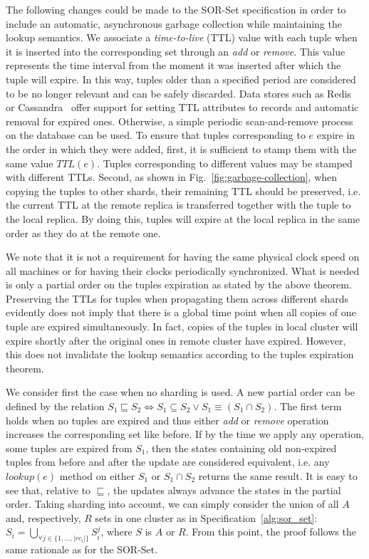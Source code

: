 The following changes could be made to the SOR-Set specification in order to
include an automatic, asynchronous garbage collection while maintaining the
lookup semantics. We associate a \textit{time-to-live} (TTL) value with each
tuple when it is inserted into the corresponding set through an \textit{add} or
\textit{remove}. This value represents the time interval from the moment it was
inserted after which the tuple will expire. In this way, tuples older than a
specified period are considered to be no longer relevant and can be safely
discarded. Data stores such as Redis~\cite{redis} or Cassandra~\cite{cassandra}
offer support for setting TTL attributes to records and automatic removal for
expired ones. Otherwise, a simple periodic scan-and-remove process on the
database can be used. To ensure that tuples corresponding to $e$ expire in the
order in which they were added, first, it is sufficient to stamp them with the
same value $TTL(e)$. Tuples corresponding to different values may be stamped
with different TTLs. Second, as shown in Fig.~\ref{fig:garbage-collection}, when
copying the tuples to other shards, their remaining TTL should be preserved,
i.e. the current TTL at the remote replica is transferred together with the
tuple to the local replica. By doing this, tuples will expire at the local
replica in the same order as they do at the remote one.

We note that it is not a requirement for having the same physical clock speed on
all machines or for having their clocks periodically synchronized. What is
needed is only a partial order on the tuples expiration as stated by the above
theorem. Preserving the TTLs for tuples when propagating them across different
shards evidently does not imply that there is a global time point when all
copies of one tuple are expired simultaneously. In fact, copies of the tuples in
local cluster will expire shortly after the original ones in remote cluster have
expired. However, this does not invalidate the lookup semantics according to the
tuples expiration theorem.

\begin{IEEEproof}
We consider first the case when no sharding is used. A new partial order can be
defined by the relation $S_{1} \sqsubseteq S_{2} \iff S_{1} \subseteq S_{2} \lor
S_{1} \equiv (S_{1} \cap S_{2})$. The first term holds when no tuples are
expired and thus either \textit{add} or \textit{remove} operation increases the
corresponding set like before. If by the time we apply any operation, some
tuples are expired from $S_{1}$, then the states containing old non-expired
tuples from before and after the update are considered equivalent, i.e. any
$\textit{lookup}(e)$ method on either $S_{1}$ or $S_{1} \cap S_{2}$ returns the
same result. It is easy to see that, relative to $\sqsubseteq$, the updates
always advance the states in the partial order. Taking sharding into account, we
can simply consider the union of all $A$ and, respectively, $R$ sets in one
cluster as in Specification~\ref{alg:sor_set}: $S_{i} = \bigcup_{\forall j \in
\{1,\ldots,|rc_{i}|\}} S_{i}^{j}$, where $S$ is $A$ or $R$. From this point, the
proof follows the same rationale as for the SOR-Set.
\end{IEEEproof}
